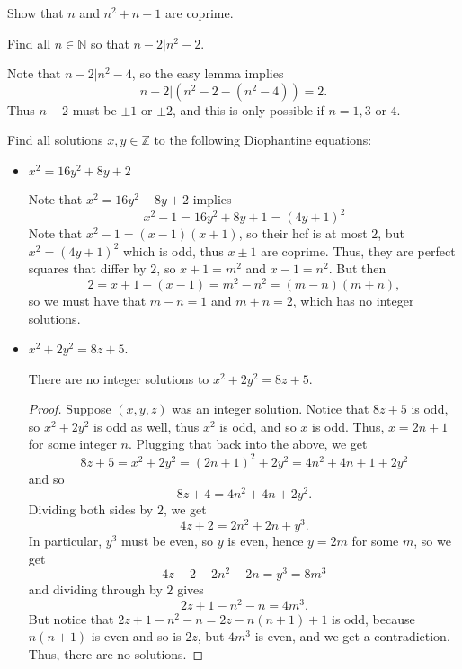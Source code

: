 \documentclass[11pt,dvipsnames]{book}
\def\Z{\mathbb{Z}}
\numberwithin{equation}{section} %
\numberwithin{figure}{section} %
\numberwithin{table}{section} %
\begin{document}
\begin{exercise} Show that $n$ and $n^2+n+1$ are coprime. 


\end{exercise}


\begin{exercise} Find all $n\in\mathbb{N}$ so that $n-2|n^2-2$. 

\begin{solution}
Note that $n-2|n^2-4$, so the easy lemma implies 
\[
n-2| (n^2-2-(n^2-4))=2.
\]
Thus $n-2$ must be $\pm 1$ or $\pm 2$, and this is only possible if $n=1,3$ or $4$.
\end{solution}

 
\end{exercise}


\begin{exercise} Find all solutions $x,y\in \Z$ to the following Diophantine equations: 
\begin{itemize}
\item $x^2=16y^2+8y+2$


\begin{solution}
Note that $x^2=16y^2+8y+2$ implies
\[
x^2-1 =16y^2+8y+1=(4y+1)^2
\]
Note that $x^2-1=(x-1)(x+1)$, so their hcf is at most $2$, but $x^2=(4y+1)^2$ which is odd, thus $x\pm 1$ are coprime. Thus, they are perfect squares that differ by $2$, so $x+1=m^2$ and $x-1=n^2$. But then
\[
2= x+1-(x-1) = m^2-n^2 = (m-n)(m+n),
\]
so we must have that $m-n=1$ and $m+n=2$, which has no integer solutions. 
\end{solution}


\item $x^2+2y^2=8z+5$. 


\begin{solution}

\begin{claim}
There are no integer solutions to $x^2+2y^2=8z+5$. 
\end{claim}

\begin{proof}
Suppose $(x,y,z)$ was an integer solution. Notice that $8z+5$ is odd, so $x^2+2y^2$ is odd as well, thus $x^2$ is odd, and so $x$ is odd. Thus, $x=2n+1$ for some integer $n$. Plugging that back into the above, we get 
\[
8z+5 =x^2+2y^2 = (2n+1)^2 +2y^2 = 4n^2 +4n+1 + 2y^2\]
and so
\[
8z+4 = 4n^2+4n+2y^2.\]
Dividing both sides by $2$, we get
\[
4z+2=2n^2+2n+y^3.\]
In particular, $y^3$ must be even, so $y$ is even, hence $y=2m$ for some $m$, so we get
\[
4z+2-2n^2-2n=y^3=8m^3
\]
and dividing through by $2$ gives
\[
2z+1-n^2-n = 4m^3.\]
But notice that $2z+1-n^2-n = 2z-n(n+1)+1$ is odd, because $n(n+1)$ is even and so is $2z$, but $4m^3$ is even, and we get a contradiction. Thus, there are no solutions.
\end{proof}
\end{solution}



\end{itemize}
\end{exercise}
\end{document}
